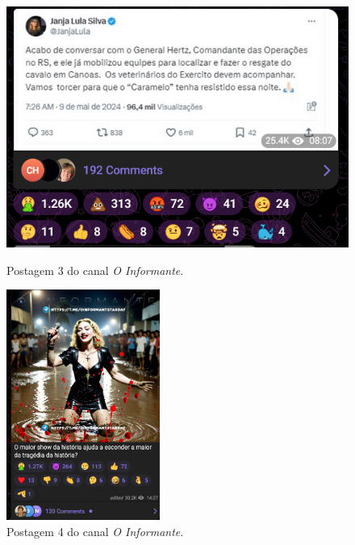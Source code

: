 \documentclass[portuguese]{textolivre}
\begin{document}
\begin{figure}[h!]
    \begin{minipage}[t]{0.57\textwidth}
        \centering
        \includegraphics[width=\linewidth]{Imagens/Fig15_1.png}
        \caption{Postagem 3 do canal \emph{O Informante}.}
        \label{fig-15}
    \end{minipage}
    \hfill
    \begin{minipage}[t]{0.27\textwidth}
        \centering
        \includegraphics[width=\linewidth]{Imagens/Fig16.png}
        \caption{Postagem 4 do canal \emph{O Informante}.}
        \label{fig-16}
    \end{minipage}
    

\end{figure}
\end{document}
